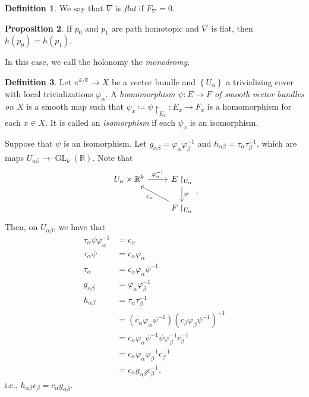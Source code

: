 \documentclass[10pt,letterpaper,cm]{nupset}
\theoremstyle{definition}
\newtheorem{definition}{Definition}[subsection]
\theoremstyle{theorem}
\newtheorem{prop}[definition]{Proposition}
\theoremstyle{remark}
\newcommand{\R}{\mathbb{R}}
\newcommand{\1}{\mathbb{1}}
\newcommand{\0}{\vec 0}
\DeclareMathOperator{\GL}{GL}
\begin{document}
\begin{definition}
We say that $\nabla$ is \textit{flat} if $F_{\nabla} =0$.
\end{definition}

\begin{prop}
If $p_0$ and $p_1$ are path homotopic and $\nabla$ is flat, then $h(p_0) = h(p_1)$. 
\end{prop}

In this case, we call the holonomy the \textit{monodromy}.

\begin{definition}
Let $\pi^{k/\R} \to X$ be a vector bundle and $\left\{U_{\alpha}\right\}$ a trivializing cover with local trivializations $\varphi_{\alpha}$. A \textit{homomorphism $\psi : E \to F$ of smooth vector bundles on $X$} is a smooth map such that $\psi_x \coloneqq \psi \restriction_{E_x} : E_x \to F_x$ is a homomorphism for each $x\in X$. It is called an \textit{isomorphism} if each $\psi_x$ is an isomorphism.  
\end{definition}

\smallskip

Suppose that $\psi$ is an isomorphism.  Let $g_{\alpha{\beta}} = \varphi_{\alpha}\varphi^{-1}_{\beta}$ and $h_{\alpha{\beta}} = \tau_{\alpha}\tau_{\beta}^{-1}$, which are maps $U_{\alpha{\beta}} \to \GL_k(\R)$. Note that 
\[
\begin{tikzcd}
U_{\alpha}\times \R^k \arrow[r, "\varphi_{\alpha}^{-1}"] & E\restriction_{U_{\alpha}} \arrow[d, "\psi"]             \\
                                                         & F \restriction_{U_{\alpha}}  \arrow[lu, "\tau_{\alpha}"]
\end{tikzcd}
.\]
 Then, on $U_{\alpha{\beta}}$, we have that 
\begin{align*}
\tau_{\alpha}\psi \varphi_{\alpha}^{-1} & = c_{\alpha}
\\ \tau_{\alpha}\psi &= c_{\alpha}\varphi_{\alpha}
\\ \tau_{\alpha} & = c_{\alpha}\varphi_{\alpha} \psi^{-1}
\\ g_{\alpha{\beta}} & = \varphi_{\alpha} \varphi_{\beta}^{-1}
\\  h_{\alpha{\beta}} & = \tau_{\alpha}\tau_{\beta}^{-1}
\\ & = (c_{\alpha} \varphi_{\alpha}\psi^{-1})(c_{\beta}\varphi_{\beta}\psi^{-1})^{-1}
\\ & = c_{\alpha}\varphi_{\alpha}\psi^{-1}\psi \varphi_{\beta}^{-1} c_{\beta}^{-1}
\\ & = c_{\alpha}\varphi_{\alpha} \varphi_{\beta}^{-1}c_{\beta}^{-1}
\\ & = c_{\alpha}g_{\alpha{\beta}}c_{\beta}^{-1}\text{,}
\end{align*}
i.e., $h_{\alpha{\beta}}c_{\beta} = c_{\alpha}g_{\alpha{\beta}}$.
\end{document}
